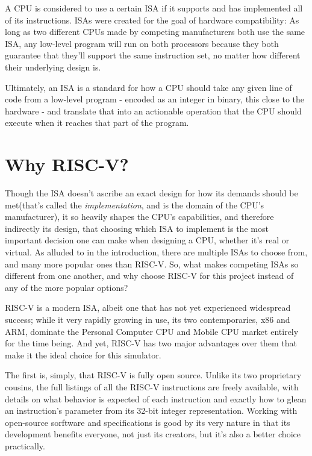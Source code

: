 \documentclass[12pt,twoside]{reedthesis}
\begin{document}
A CPU is considered to use a certain ISA if it supports and has implemented all of its instructions. ISAs were created for the goal of hardware compatibility: As long as two different CPUs made by competing manufacturers both use the same ISA, any low-level program will run on both processors because they both guarantee that they'll support the same instruction set, no matter how different their underlying design is.

Ultimately, an ISA is a standard for how a CPU should take any given line of code from a low-level program - encoded as an integer in binary, this close to the hardware - and translate that into an actionable operation that the CPU should execute when it reaches that part of the program.

\section{Why RISC-V?}
Though the ISA doesn't ascribe an exact design for how its demands should be met(that's called the \textit{implementation}, and is the domain of the CPU's manufacturer), it so heavily shapes the CPU's capabilities, and therefore indirectly its design, that choosing which ISA to implement is the most important decision one can make when designing a CPU, whether it's real or virtual. As alluded to in the introduction, there are multiple ISAs to choose from, and many more popular ones than RISC-V. So, what makes competing ISAs so different from one another, and why choose RISC-V for this project instead of any of the more popular options?


RISC-V is a modern ISA, albeit one that has not yet experienced widespread success; while it very rapidly growing in use, its two contemporaries, x86 and ARM, dominate the Personal Computer CPU and Mobile CPU market entirely for the time being. And yet, RISC-V has two major advantages over them that make it the ideal choice for this simulator.

The first is, simply, that RISC-V is fully open source. Unlike its two proprietary cousins, the full listings of all the RISC-V instructions are freely available, with details on what behavior is expected of each instruction and exactly how to glean an instruction's parameter from its 32-bit integer representation. Working with open-source sorftware and specifications is good by its very nature in that its development benefits everyone, not just its creators, but it's also a better choice practically.
\end{document}
